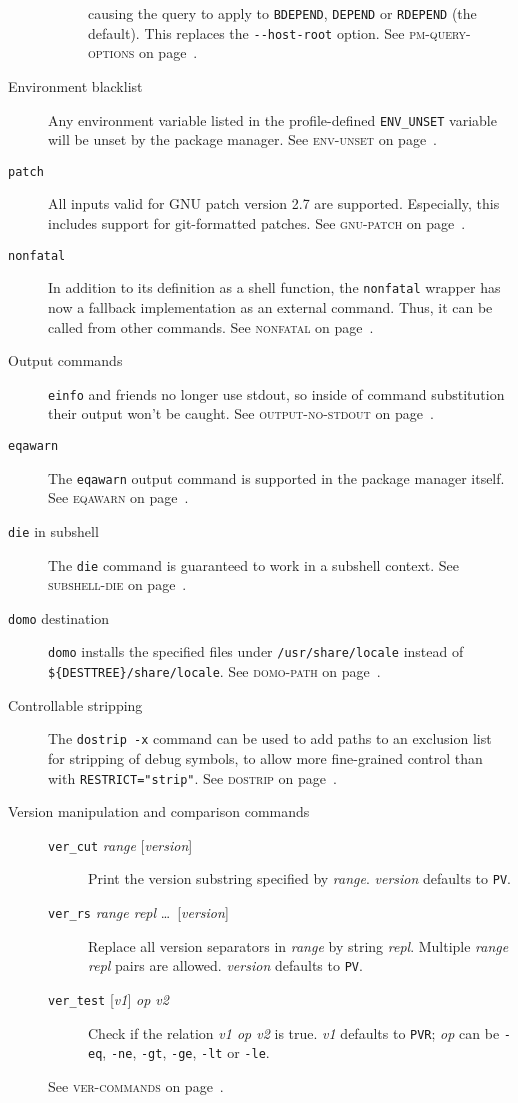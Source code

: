 \documentclass[a4paper,nofoldmark]{leaflet}
\newcommand{\code}[1]{\texttt{#1}}
\newcommand{\featureref}[1]{\textsc{#1} on page~\pageref{feat:#1}}
\begin{document}
\begin{description}
\begin{description}
        causing the query to apply to \code{BDEPEND}, \code{DEPEND}
        or \code{RDEPEND} (the default). This replaces the
        \code{-{}-host-root} option.
        See \featureref{pm-query-options}.
    \end{description}
    \item[Environment blacklist] Any environment variable listed in
    the profile-defined \code{ENV_UNSET} variable will be unset by the
    package manager.
    See \featureref{env-unset}.
    \item[\code{patch}] All inputs valid for GNU patch version 2.7
    are supported. Especially, this includes support for git-formatted
    patches.
    See \featureref{gnu-patch}.
    \item[\code{nonfatal}] In addition to its definition as a shell
    function, the \code{nonfatal} wrapper has now a fallback
    implementation as an external command. Thus, it can be called
    from other commands.
    See \featureref{nonfatal}.
    \item[Output commands] \code{einfo} and friends no longer use
    stdout, so inside of command substitution their output won't be
    caught.
    See \featureref{output-no-stdout}.
    \item[\code{eqawarn}] The \code{eqawarn} output command is
    supported in the package manager itself.
    See \featureref{eqawarn}.
    \item[\code{die} in subshell] The \code{die} command is guaranteed
    to work in a subshell context.
    See \featureref{subshell-die}.
    \item[\code{domo} destination] \code{domo} installs the specified
    files under \code{/usr/share/locale} instead of
    \code{\$\{DESTTREE\}/\allowbreak share/locale}.
    See \featureref{domo-path}.
    \item[Controllable stripping] The \code{dostrip -x} command can be
    used to add paths to an exclusion list for stripping of debug
    symbols, to allow more fine-grained control than with
    \code{RESTRICT="strip"}.
    See \featureref{dostrip}.
    \item[Version manipulation and comparison commands] \mbox{}
    \begin{description}
        \item[\code{ver_cut} \emph{range} {[\emph{version}]}]
        Print the version substring specified by \emph{range}.
        \emph{version} defaults to \code{PV}.
        \item[\code{ver_rs} \emph{range repl} \dots\ {[\emph{version}]}]
        Replace all version separators in \emph{range} by string
        \emph{repl}. Multiple \emph{range repl} pairs are allowed.
        \emph{version} defaults to \code{PV}.
        \item[\code{ver_test} {[\emph{v1}]} \emph{op v2}]
        Check if the relation \emph{v1 op v2} is true.
        \emph{v1} defaults to \code{PVR}; \emph{op} can be \code{-eq},
        \code{-ne}, \code{-gt}, \code{-ge}, \code{-lt} or \code{-le}.
    \end{description}
    See \featureref{ver-commands}.
\end{description}
\end{document}
